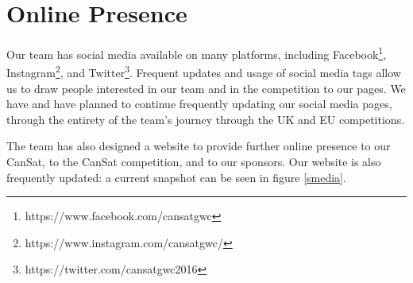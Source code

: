 \documentclass[]{report}
\begin{document}
	\section{Online Presence}
	Our team has social media available on many platforms, including Facebook\footnote{https://www.facebook.com/cansatgwc}, Instagram\footnote{https://www.instagram.com/cansatgwc/}, and Twitter\footnote{https://twitter.com/cansatgwc2016}. Frequent updates and usage of social media tags allow us to draw people interested in our team and in the competition to our pages. We have and have planned to continue frequently updating our social media pages, through the entirety of the team's journey through the UK and EU competitions.
	
	The team has also designed a website to provide further online presence to our CanSat, to the CanSat competition, and to our sponsors. Our website is also frequently updated: a current snapshot can be seen in figure \ref{smedia}. 
	
\end{document}
